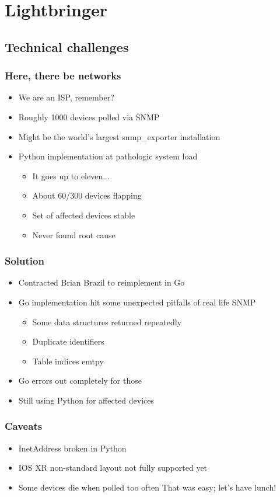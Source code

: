 \documentclass[t]{beamer}
\begin{document}
\section{Lightbringer}

\subsection{Technical challenges}

\begin{frame}
	\frametitle{Here, there be networks}
	\begin{itemize}
		\item We are an ISP, remember?
		\item Roughly 1000 devices polled via SNMP
		\item Might be the world's largest snmp\_exporter installation
		\item Python implementation at pathologic system load
		\begin{itemize}
			\item It goes up to eleven...
			\item About 60/300 devices flapping
			\item Set of affected devices stable
			\item Never found root cause
		\end{itemize}
	\end{itemize}
\end{frame}

\begin{frame}
	\frametitle{Solution}
	\begin{itemize}
		\item Contracted Brian Brazil to reimplement in Go
		\item Go implementation hit some unexpected pitfalls of real life SNMP
		\begin{itemize}
			\item Some data structures returned repeatedly
			\item Duplicate identifiers
			\item Table indices emtpy
		\end{itemize}
		\item Go errors out completely for those
		\item Still using Python for affected devices
	\end{itemize}
\end{frame}

\begin{frame}
	\frametitle{Caveats}
	\begin{itemize}
		\item InetAddress broken in Python
		\item IOS XR non-standard layout not fully supported yet 
		\item Some devices die when polled too often
		\vfill
			That was easy; let's have lunch!
	\end{itemize}
\end{frame}
\end{document}
